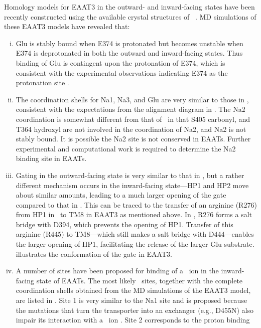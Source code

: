 Homology models for EAAT3 in the outward- and inward-facing states have been 
recently constructed using the available crystal structures of \GltPh\ 
\cite{Heinzelmann2014b}. MD simulations of these EAAT3 models have revealed 
that:
\begin{enumerate}[(i)]
    \item Glu is stably bound when E374 is protonated but becomes unstable when 
    E374 is deprotonated in both the outward and inward-facing states. Thus 
    binding of Glu is contingent upon the protonation of E374, which is consistent 
    with the experimental observations indicating E374 as the protonation site 
    \cite{Watzke2000,Grewer2003b}.
    \item The coordination shells for Na1, Na3, and Glu are very similar to those 
    in \GltPh, consistent with the expectations from the alignment diagram in 
    \tabref{review:tab2}. The Na2 coordination is somewhat different from that of 
    \GltPh\ in that S405 carbonyl, and T364 hydroxyl are not involved in the 
    coordination of Na2, and Na2 is not stably bound. It is possible the Na2 site 
    is not conserved in EAATs. Further experimental and computational work is 
    required to determine the Na2 binding site in EAATs.
    \item Gating in the outward-facing state is very similar to that in \GltPh, 
    but a rather different mechanism occurs in the inward-facing state---HP1 and 
    HP2 move about similar amounts, leading to a much larger opening of the gate 
    compared to that in \GltPh. This can be traced to the transfer of an
    arginine (R276) from HP1 in \GltPh\ to TM8 in EAAT3 as mentioned above. In 
    \GltPh, R276 forms a salt bridge with D394, which prevents the opening of 
    HP1. Transfer of this arginine (R445) to TM8---which still makes a salt 
    bridge with D444---enables the larger opening of HP1, facilitating the release of 
    the larger Glu substrate. \figref{review:fig4} illustrates the conformation
    of the gate in EAAT3.
    \item A number of sites have been proposed for binding of a \K\ ion in the 
    inward-facing state of EAATs. The most likely \K\ sites, together with the 
    complete coordination shells obtained from the MD simulations of the EAAT3 
    model, are listed in \tabref{review:tab3}. Site 1 is very similar to the Na1 
    site and is proposed because the mutations that turn the transporter into 
    an exchanger (e.g., D455N) also impair its interaction with a \K\ ion 
    \cite{Teichman2009,Mwaura2012}. Site 2 corresponds to the proton binding 

\end{enumerate}
